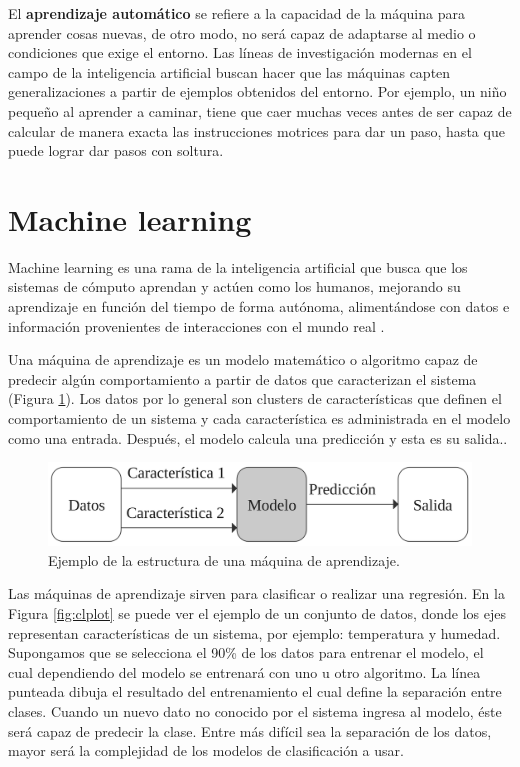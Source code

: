 \documentclass[twoside,spanish,ESP,MSc]{plantillaLabUPV}
\theoremstyle{definition}
\begin{document}
El \textbf{aprendizaje automático} se refiere a la capacidad de la máquina para aprender cosas nuevas, de otro modo, no será capaz de adaptarse al medio o condiciones que exige el entorno. Las líneas de investigación modernas en el campo de la inteligencia artificial buscan hacer que las máquinas capten generalizaciones a partir de ejemplos obtenidos del entorno. Por ejemplo, un niño pequeño al aprender a caminar, tiene que caer muchas veces antes de ser capaz de calcular de manera exacta las instrucciones motrices para dar un paso, hasta que puede lograr dar pasos con soltura.


\section{Machine learning}

Machine learning es una rama de la inteligencia artificial que busca que los sistemas de cómputo aprendan y actúen como los humanos, mejorando su aprendizaje en función del tiempo de forma autónoma, alimentándose con datos e información provenientes de interacciones con el mundo real \cite{supervisadobook}.

Una máquina de aprendizaje es un modelo matemático o algoritmo capaz de predecir algún comportamiento a partir de datos que caracterizan el sistema (Figura \ref{fml}). Los datos por lo general son clusters de características que definen el comportamiento de un sistema y cada característica es administrada en el modelo como una entrada. Después, el modelo calcula una predicción y esta es su salida..

\begin{figure}[!tbh] 
	\centering 
		\includegraphics[scale=.30]{ima_mc/flujoml} 
	\caption{Ejemplo de la estructura de una máquina de aprendizaje.} 
	\label{fml} 
\end{figure}

Las máquinas de aprendizaje sirven para clasificar o realizar una regresión. En la Figura \ref{fig:clplot} se puede ver el ejemplo de un conjunto de datos, donde los ejes representan características de un sistema, por ejemplo: temperatura y humedad. Supongamos que se selecciona el 90\% de los datos para entrenar el modelo, el cual dependiendo del modelo se entrenará con uno u otro algoritmo.
La línea punteada dibuja el resultado del entrenamiento el cual define la separación entre clases. Cuando un nuevo dato no conocido por el sistema ingresa al modelo, éste será capaz de predecir la clase. Entre más difícil sea la separación de los datos, mayor será la complejidad de los modelos de clasificación a usar.
\end{document}
